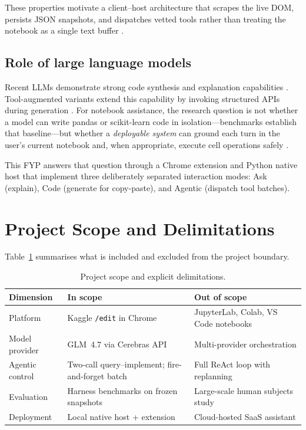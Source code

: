 These properties motivate a client--host architecture that scrapes the live \ac{DOM}, persists JSON snapshots, and dispatches vetted tools rather than treating the notebook as a single text buffer \parencite{chasins2018roussillon,lewis2020rag}.

\subsection{Role of large language models}

Recent \acp{LLM} demonstrate strong code synthesis and explanation capabilities \parencite{brown2020language,chen2021codex,openai2023gpt4}. Tool-augmented variants extend this capability by invoking structured APIs during generation \parencite{schick2023toolformer,qin2024toolllm,yao2023react}. For notebook assistance, the research question is not whether a model can write pandas or scikit-learn code in isolation---benchmarks establish that baseline---but whether a \emph{deployable system} can ground each turn in the user's current notebook and, when appropriate, execute cell operations safely \parencite{hou2024llm4se,vaithilingam2022expectation}.

This FYP answers that question through a Chrome extension and Python native host that implement three deliberately separated interaction modes: Ask (explain), Code (generate for copy-paste), and Agentic (dispatch tool batches).

\section{Project Scope and Delimitations}
\label{sec:scope}

Table~\ref{tab:scope} summarises what is included and excluded from the project boundary.

\begin{table}[!ht]
\centering
\caption{Project scope and explicit delimitations.}
\label{tab:scope}
\small
\begin{tabular}{|p{3.2cm}|p{4.8cm}|p{4.8cm}|}
\hline
\textbf{Dimension} & \textbf{In scope} & \textbf{Out of scope} \\ \hline
Platform & Kaggle \texttt{/edit} in Chrome & JupyterLab, Colab, VS Code notebooks \\ \hline
Model provider & GLM~4.7 via Cerebras \ac{API} & Multi-provider orchestration \\ \hline
Agentic control & Two-call query--implement; fire-and-forget batch & Full ReAct loop with replanning \\ \hline
Evaluation & Harness benchmarks on frozen snapshots & Large-scale human subjects study \\ \hline
Deployment & Local native host + extension & Cloud-hosted SaaS assistant \\ \hline
\end{tabular}
\end{table}


